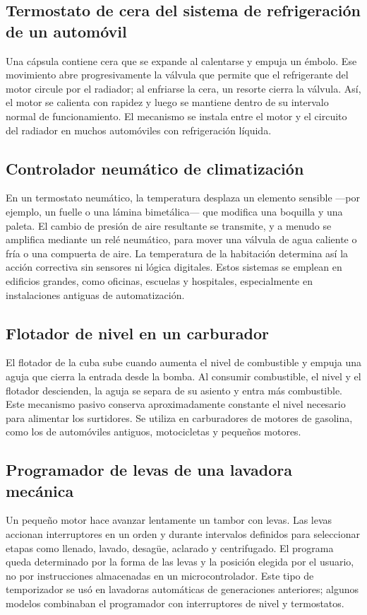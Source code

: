 \documentclass[12pt,a4paper]{article}
\begin{document}
\subsection{Termostato de cera del sistema de refrigeración de un automóvil}

Una cápsula contiene cera que se expande al calentarse y empuja un émbolo. Ese movimiento abre progresivamente la válvula que permite que el refrigerante del motor circule por el radiador; al enfriarse la cera, un resorte cierra la válvula. Así, el motor se calienta con rapidez y luego se mantiene dentro de su intervalo normal de funcionamiento. El mecanismo se instala entre el motor y el circuito del radiador en muchos automóviles con refrigeración líquida.

\subsection{Controlador neumático de climatización}

En un termostato neumático, la temperatura desplaza un elemento sensible —por ejemplo, un fuelle o una lámina bimetálica— que modifica una boquilla y una paleta. El cambio de presión de aire resultante se transmite, y a menudo se amplifica mediante un relé neumático, para mover una válvula de agua caliente o fría o una compuerta de aire. La temperatura de la habitación determina así la acción correctiva sin sensores ni lógica digitales. Estos sistemas se emplean en edificios grandes, como oficinas, escuelas y hospitales, especialmente en instalaciones antiguas de automatización.

\subsection{Flotador de nivel en un carburador}

El flotador de la cuba sube cuando aumenta el nivel de combustible y empuja una aguja que cierra la entrada desde la bomba. Al consumir combustible, el nivel y el flotador descienden, la aguja se separa de su asiento y entra más combustible. Este mecanismo pasivo conserva aproximadamente constante el nivel necesario para alimentar los surtidores. Se utiliza en carburadores de motores de gasolina, como los de automóviles antiguos, motocicletas y pequeños motores.

\subsection{Programador de levas de una lavadora mecánica}

Un pequeño motor hace avanzar lentamente un tambor con levas. Las levas accionan interruptores en un orden y durante intervalos definidos para seleccionar etapas como llenado, lavado, desagüe, aclarado y centrifugado. El programa queda determinado por la forma de las levas y la posición elegida por el usuario, no por instrucciones almacenadas en un microcontrolador. Este tipo de temporizador se usó en lavadoras automáticas de generaciones anteriores; algunos modelos combinaban el programador con interruptores de nivel y termostatos.
\end{document}
